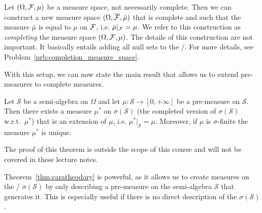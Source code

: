 Let $(\Omega, \mathcal F, \mu)$ be a measure space, not necessarily complete. Then we can construct a new measure space $(\Omega, \overline{\mathcal F}, \bar{\mu})$ that is complete and such that the measure $\bar{\mu}$ is equal to $\mu$ on $\mathcal F$, i.e. $\bar{\mu}|_{\mathcal F} = \mu$. We refer to this construction as \emph{completing} the measure space $(\Omega, \mathcal F, \mu)$. The details of this construction are not important. It basically entails adding all null sets to the \sigalg/. For more details, see Problem~\ref{prb:completion_measure_space}.

With this setup, we can now state the main result that allows us to extend pre-measures to complete measures.

\begin{theorem}\label{thm:caratheodory}
Let $\mathcal{S}$ be a semi-algebra on $\Omega$ and let $\mu : \mathcal{S} \to [0,+\infty]$ be a pre-measure on $\mathcal{S}$. Then there exists a measure $\mu^\ast$ on $\overline{\sigma(\mathcal{S})}$ (the completed version of $\sigma(\mathcal{S})$ w.r.t.\ $\mu^\ast$) that is an extension of $\mu$, i.e. $\mu^\ast|_\mathcal{S} = \mu$. Moreover, if $\mu$ is $\sigma$-finite the measure $\mu^\ast$ is unique.
\end{theorem}

The proof of this theorem is outside the scope of this course and will not be covered in these lecture notes. 

Theorem~\ref{thm:caratheodory} is powerful, as it allows us to create measures on the \sigalg/ $\sigma(\mathcal{S})$ by only describing a pre-measure on the semi-algebra $\mathcal{S}$ that generates it. This is especially useful if there is no direct description of the $\sigma(\mathcal{S})$. 

